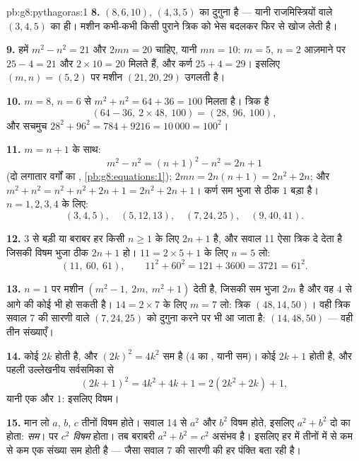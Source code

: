 \begin{solution}{pb:g8:pythagoras:1}
\textbf{8.} $(8, 6, 10)$, $(4, 3, 5)$ का दुगुना है --- यानी
राजमिस्त्रियों वाले $(3, 4, 5)$ का ही। मशीन कभी-कभी किसी पुराने
त्रिक को भेस बदलकर फिर से खोज लेती है।

\textbf{9.} हमें $m^2 - n^2 = 21$ और $2mn = 20$ चाहिए, यानी
$mn = 10$: $m = 5$, $n = 2$ आज़माने पर $25 - 4 = 21$ और
$2 \times 10 = 20$ मिलते हैं, और कर्ण $25 + 4 = 29$। इसलिए
$(m, n) = (5, 2)$ पर मशीन $(21, 20, 29)$ उगलती है।

\textbf{10.} $m = 8$, $n = 6$ से $m^2 + n^2 = 64 + 36 = 100$
मिलता है। त्रिक है
\[
\left(64 - 36,\ 2 \times 48,\ 100\right) = (28,\ 96,\ 100),
\]
और सचमुच $28^2 + 96^2 = 784 + 9216 = 10\,000 = 100^2$।

\textbf{11.} $m = n + 1$ के साथ:
\[
m^2 - n^2 = (n + 1)^2 - n^2 = 2n + 1
\]
(दो लगातार वर्गों का , \cref{pb:g8:equations:1});
$2mn = 2n(n + 1) = 2n^2 + 2n$; और
$m^2 + n^2 = n^2 + n^2 + 2n + 1 = 2n^2 + 2n + 1$। कर्ण सम 
भुजा से ठीक $1$ बड़ा है। $n = 1, 2, 3, 4$ के लिए:
\[
(3, 4, 5), \quad (5, 12, 13), \quad (7, 24, 25), \quad
(9, 40, 41) .
\]

\textbf{12.} $3$ से बड़ी या बराबर हर  किसी $n \geq 1$
के लिए $2n + 1$ है, और सवाल 11 ऐसा त्रिक दे देता है जिसकी विषम
 भुजा ठीक $2n + 1$ हो। $11 = 2 \times 5 + 1$ के लिए $n = 5$
लो:
\[
(11,\ 60,\ 61),
\qquad
11^2 + 60^2 = 121 + 3600 = 3721 = 61^2 .
\]

\textbf{13.} $n = 1$ पर मशीन
$\left(m^2 - 1,\ 2m,\ m^2 + 1\right)$ देती है, जिसकी सम  भुजा
$2m$ है और वह $4$ से आगे की कोई भी  हो सकती है।
$14 = 2 \times 7$ के लिए $m = 7$ लो: त्रिक $(48, 14, 50)$। वही
त्रिक सवाल 7 की सारणी वाले $(7, 24, 25)$ को दुगुना करने पर भी आ
जाता है: $(14, 48, 50)$ --- वही तीन संख्याएँ।

\textbf{14.} कोई  $2k$ होती है, और $(2k)^2 = 4k^2$ सम
है ($4$ का , यानी सम)। कोई  $2k + 1$ होती है, और
पहली उल्लेखनीय सर्वसमिका से
\[
(2k + 1)^2 = 4k^2 + 4k + 1 = 2\left(2k^2 + 2k\right) + 1 ,
\]
यानी एक  और $1$: इसलिए विषम।

\textbf{15.} मान लो $a$, $b$, $c$ तीनों विषम होते। सवाल 14 से
$a^2$ और $b^2$ विषम होते, इसलिए $a^2 + b^2$ दो  का
 होता: \emph{सम}। पर $c^2$ \emph{विषम} होता। तब बराबरी
$a^2 + b^2 = c^2$ असंभव है। इसलिए हर  में तीनों में
से कम से कम एक संख्या सम होती है --- जैसा सवाल 7 की सारणी की हर
पंक्ति बता रही है।

\end{solution}
